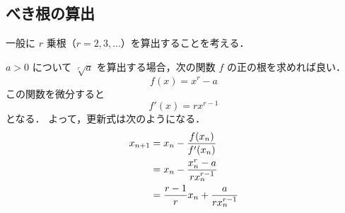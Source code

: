 \subsection{べき根の算出}

一般に $r$ 乗根（$r = 2, 3, \ldots$）を算出することを考える．

$a>0$ について $\sqrt[r]{a}$ を算出する場合，次の関数 $f$ の正の根を求めれば良い．
\begin{equation}
    f(x) = x^r - a
\end{equation}
この関数を微分すると
\begin{equation}
    f'(x) = rx^{r-1}
\end{equation}
となる．
よって，更新式は次のようになる．
\begin{align}
    x_{n+1} & = x_n - \frac{f(x_n)}{f'(x_n)}             \notag \\
            & = x_n - \frac{x_n^r - a}{rx_n^{r-1}}       \notag \\
            & = \frac{r-1}{r} x_n + \frac{a}{rx_n^{r-1}}
    \label{eq:root-finding_newton-raphson_rth-root-update-law}
\end{align}

